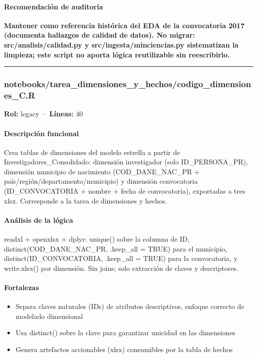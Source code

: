 \paragraph{Recomendación de auditoría}
\textbf{Mantener como referencia histórica del EDA de la convocatoria 2017 (documenta hallazgos de calidad de datos). No migrar: src/analisis/calidad.py y src/ingesta/minciencias.py sistematizan la limpieza; este script no aporta lógica reutilizable sin reescribirlo.}

\medskip
\hrule

\subsubsection{notebooks/tarea\_dimensiones\_y\_hechos/codigo\_dimensiones\_C.R}
\textbf{Rol:} legacy · \textbf{Líneas:} 40

\paragraph{Descripción funcional}
Crea tablas de dimensiones del modelo estrella a partir de Investigadores\_Consolidado: dimensión investigador (solo ID\_PERSONA\_PR), dimensión municipio de nacimiento (COD\_DANE\_NAC\_PR + país/región/departamento/municipio) y dimensión convocatoria (ID\_CONVOCATORIA + nombre + fecha de convocatoria), exportadas a tres xlsx. Corresponde a la tarea de dimensiones y hechos.

\paragraph{Análisis de la lógica}
readxl + openxlsx + dplyr: unique() sobre la columna de ID, distinct(COD\_DANE\_NAC\_PR, .keep\_all = TRUE) para el municipio, distinct(ID\_CONVOCATORIA, .keep\_all = TRUE) para la convocatoria, y write.xlsx() por dimensión. Sin joins; solo extracción de claves y descriptores.

\paragraph{Fortalezas}
\begin{itemize}
  \item Separa claves naturales (IDs) de atributos descriptivos, enfoque correcto de modelado dimensional
  \item Usa distinct() sobre la clave para garantizar unicidad en las dimensiones
  \item Genera artefactos accionables (xlsx) consumibles por la tabla de hechos
\end{itemize}

